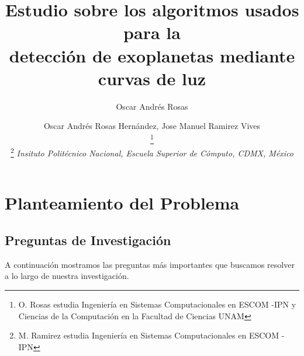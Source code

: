 \documentclass[fleqn, journal]{IEEEtran}                        %
\author{Oscar Andrés Rosas}                                     %
\theoremstyle{break}                                            %
\begin{document}
    \title{Estudio sobre los algoritmos usados para la \\ detección de exoplanetas mediante curvas de luz}

    \author{
        Oscar Andrés Rosas Hernández,
        Jose Manuel Ramirez Vives
    
        \thanks {
            O. Rosas estudia Ingeniería en Sistemas Computacionales en ESCOM -IPN y Ciencias de
            la Computación en la Facultad de Ciencias UNAM
        }
        
        \thanks {
            M. Ramirez estudia Ingeniería en Sistemas Computacionales en ESCOM -IPN
        }
        \textit{
            Insituto Politécnico Nacional, Escuela Superior de Cómputo, CDMX, México
        }
    }
    


    \maketitle


\section{Planteamiento del Problema}

    \subsection{Preguntas de Investigación}

        A continuación mostramos las preguntas más importantes que buscamos
        resolver a lo largo de nuestra investigación.
\end{document}
